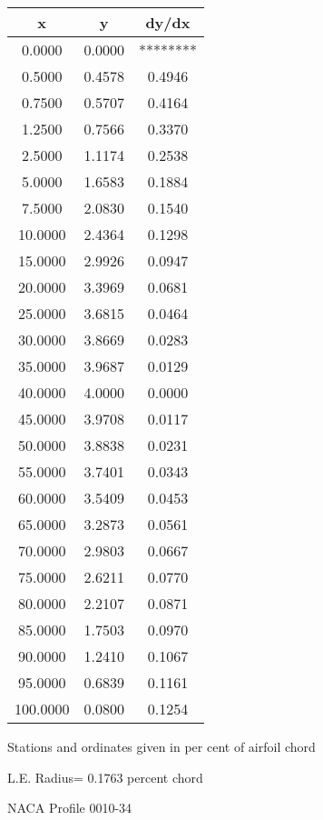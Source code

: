 \documentclass[11pt]{book}
\begin{document}
 \vspace{8mm}
 \begin{tabular}{|c|c|c|} \hline 
  x  &  y  &  dy/dx \\
 \hline
0.0000 & 0.0000 & ******** \\
0.5000 & 0.4578 & 0.4946 \\
0.7500 & 0.5707 & 0.4164 \\
1.2500 & 0.7566 & 0.3370 \\
2.5000 & 1.1174 & 0.2538 \\
5.0000 & 1.6583 & 0.1884 \\
7.5000 & 2.0830 & 0.1540 \\
10.0000 & 2.4364 & 0.1298 \\
15.0000 & 2.9926 & 0.0947 \\
20.0000 & 3.3969 & 0.0681 \\
25.0000 & 3.6815 & 0.0464 \\
30.0000 & 3.8669 & 0.0283 \\
35.0000 & 3.9687 & 0.0129 \\
40.0000 & 4.0000 & 0.0000 \\
45.0000 & 3.9708 & 0.0117 \\
50.0000 & 3.8838 & 0.0231 \\
55.0000 & 3.7401 & 0.0343 \\
60.0000 & 3.5409 & 0.0453 \\
65.0000 & 3.2873 & 0.0561 \\
70.0000 & 2.9803 & 0.0667 \\
75.0000 & 2.6211 & 0.0770 \\
80.0000 & 2.2107 & 0.0871 \\
85.0000 & 1.7503 & 0.0970 \\
90.0000 & 1.2410 & 0.1067 \\
95.0000 & 0.6839 & 0.1161 \\
100.0000 & 0.0800 & 0.1254 \\
 \hline
 \end{tabular}
 \vspace{8mm}


Stations and ordinates given in per cent of airfoil chord 


L.E. Radius=  0.1763 percent chord
 \newpage
  \label{p0010-34}
 \begin{Large}
 NACA Profile 0010-34
 \end{Large}
  
\end{document}
